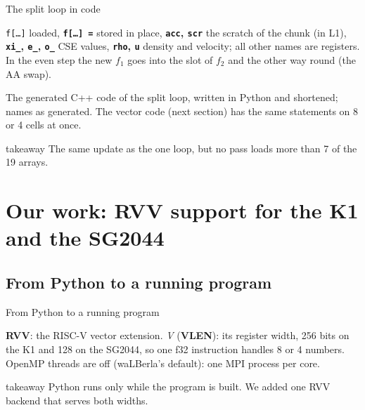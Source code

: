 \documentclass[aspectratio=169,10pt,t]{beamer}
\newcommand{\term}[1]{\textcolor{psblue!85!black}{\textbf{#1}}} %
\newcommand{\code}[1]{\texttt{#1}}
\newcommand{\takeaway}[1]{\par\vfill
  \begin{beamercolorbox}[wd=\textwidth,sep=4pt,rounded=true]{takeaway}
    \small #1
  \end{beamercolorbox}}
\begin{document}
\begin{frame}{The split loop in code}
  \vspace{1mm}
  \centering

  \vspace{1.5mm}
  \raggedright
  {\scriptsize
  \textcolor{psorange!85!black}{\code{f[\ldots]}} loaded,
  \textcolor{psblue!85!black}{\textbf{\code{f[\ldots] =}}} stored in place,
  \textcolor{ccomm!65!black}{\textbf{\code{acc}, \code{scr}}} the scratch of the chunk (in L1),
  \textcolor{psviolet}{\textbf{\code{xi\_}, \code{e\_}, \code{o\_}}} CSE values,
  \textcolor{psteal!65!black}{\textbf{\code{rho}, \code{u}}} density and velocity; all other names are registers.
  In the even step the new $f_1$ goes into the slot of $f_2$ and the other way round (the AA swap).\par}
  \vspace{0.5mm}
  {\scriptsize\color{psgray}The generated C++ code of the split loop, written in Python and shortened; names as
  generated. The vector code (next section) has the same statements on 8 or 4 cells at once.\par}
  \takeaway{The same update as the one loop, but no pass loads more than 7 of the 19 arrays.}
\end{frame}
\section[Our RVV support]{Our work: RVV support for the K1 and the SG2044}
\subsection{From Python to a running program}
\begin{frame}{From Python to a running program}
  \vspace{1mm}
  \centering

  \vspace{1mm}
  \raggedright{\scriptsize\color{psgray}\term{RVV}: the RISC-V vector extension. \textit{V} (\term{VLEN}): its
  register width, 256 bits on the K1 and 128 on the SG2044, so one f32 instruction handles 8 or 4 numbers.
  OpenMP threads are off (waLBerla's default): one MPI process per core.\par}
  \takeaway{Python runs only while the program is built. We added one RVV backend that serves both widths.}
\end{frame}
\end{document}
